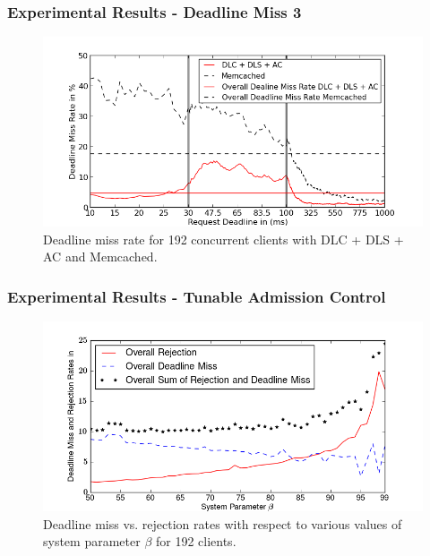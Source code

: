 \documentclass{beamer}
\begin{document}
\begin{frame}
\frametitle{Experimental Results - Deadline Miss 3}
\begin{figure}[t]
\begin{center}
\centerline{\includegraphics[scale=0.5]{img/EC2/EC2_AC_MM/miss_48.png}}
\caption{Deadline miss rate for 192 concurrent clients with DLC + DLS + AC and Memcached.}
\label{fig:miss_192_ac_mm}
\end{center}
\end{figure}
\end{frame}

\begin{frame}
\frametitle{Experimental Results - Tunable Admission Control}
\begin{figure}[t]
\begin{center}
\centerline{\includegraphics[scale=0.5]{img/EC2/Varying_ac/varying_acPerc_192.png}}
\caption{Deadline miss vs. rejection rates with respect to various values of
  system parameter $\beta$ for 192 clients.}
\label{fig:varying_ac}
\end{center}
\end{figure}
\end{frame}
\end{document}
